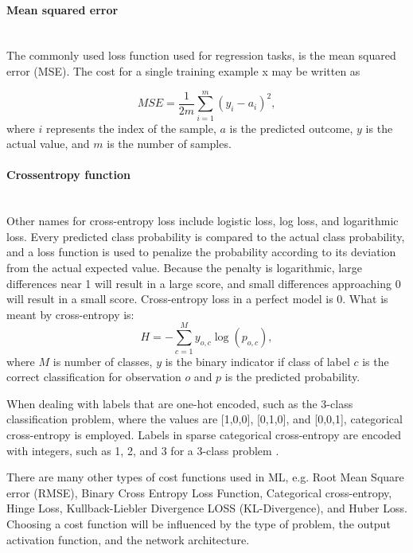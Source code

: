 \paragraph{Mean squared error}\mbox{}\\
The commonly used loss function used for regression tasks, is the mean squared error (MSE). 
The cost for a single training example x may be written as


\begin{equation}
	MSE = \frac{1}{2m} \sum_{i=1}^{m} (y_i - a_i)^2,
	\label{eq:mse}
\end{equation}
where
$i$ represents the index of the sample,
$a$ is the predicted outcome,
$y$ is the actual value, and
$m$ is the number of samples.

\paragraph{Crossentropy function}\mbox{}\\
Other names for cross-entropy loss include logistic loss, log loss, and logarithmic loss. Every predicted class probability is compared to the actual class probability, and a loss function is used to penalize the probability according to its deviation from the actual expected value. Because the penalty is logarithmic, large differences near 1 will result in a large score, and small differences approaching 0 will result in a small score. Cross-entropy loss in a perfect model is 0.
What is meant by cross-entropy is:
\begin{equation}
	H = -\sum_{c=1}^My_{o,c}\log(p_{o,c}),
\end{equation}
where $M$ is number of classes, $y$ is the binary indicator if class of label $c$ is the correct classification for observation $o$ and $p$ is the predicted probability.

When dealing with labels that are one-hot encoded, such as the 3-class classification problem, where the values are [1,0,0], [0,1,0], and [0,0,1], categorical cross-entropy is employed.
Labels in sparse categorical cross-entropy are encoded with integers, such as 1, 2, and 3 for a 3-class problem \cite{inproceedings}.



There are many other types of cost functions used in ML, e.g. Root Mean Square error (RMSE), Binary Cross Entropy Loss Function,  Categorical cross-entropy, Hinge Loss, Kullback-Liebler Divergence LOSS (KL-Divergence), and Huber Loss. Choosing a cost function will be influenced by the type of problem, the output activation function, and the network architecture.


